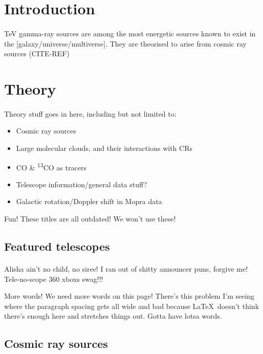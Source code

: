 \documentclass[a4paper, titlepage, oneside]{article}
\newcommand{\elem}[2]{\textsuperscript{#1}{#2}}
\begin{document}
\begin{multicols}{2}
\section{Introduction}
\paragraph{}
TeV gamma-ray sources are among the most energetic sources known to exist in the [galaxy/universe/multiverse]. They are theorised to arise from cosmic ray sources (CITE-REF)

\section{Theory}
\paragraph{}
Theory stuff goes in here, including but not limited to:
\begin{itemize}
  \item Cosmic ray sources
  \item Large molecular clouds, and their interactions with CRs
  \item CO \& \elem{13}{CO} as tracers
  \item Telescope information/general data stuff?
  \item Galactic rotation/Doppler shift in Mopra data
\end{itemize}
Fun! These titles are all outdated! We won't use these!

\subsection{Featured telescopes}
\paragraph{}
Alisha ain't no child, no siree! I ran out of shitty announcer puns, forgive me! Tele-no-scope 360 xboxs swag!!!

More words! We need more words on this page! There's this problem I'm seeing where the paragraph spacing gets all wide and bad because \LaTeX~doesn't think there's enough here and stretches things out. Gotta have lotsa words.

\subsection{Cosmic ray sources}

\end{multicols}
\end{document}
